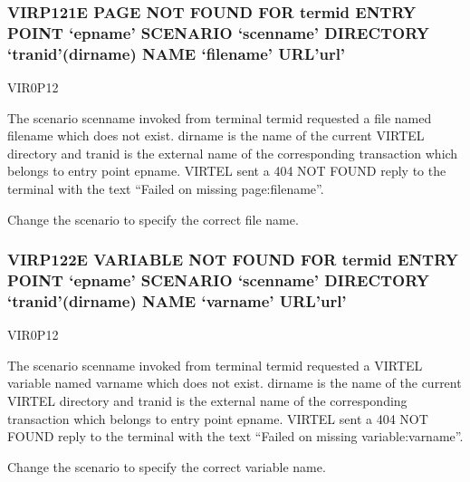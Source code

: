 \documentclass[letterpaper,10pt,english]{sphinxmanual}
\begin{document}
\subsubsection{VIRP121E PAGE NOT FOUND FOR termid ENTRY POINT ‘epname’ SCENARIO ‘scenname’ DIRECTORY ‘tranid’(dirname) NAME ‘filename’ URL’url’}
\label{\detokenize{messages:virp121e-page-not-found-for-termid-entry-point-epname-scenario-scenname-directory-tranid-dirname-name-filename-url-url}}\begin{description}
\sphinxAtStartPar
VIR0P12

\sphinxAtStartPar
The scenario scenname invoked from terminal termid requested a file named filename which does not exist. dirname is the name of the current VIRTEL directory and tranid is the external name of the corresponding transaction which belongs to entry point epname. VIRTEL sent a 404 NOT FOUND reply to the terminal with the text “Failed on missing page:filename”.

\sphinxAtStartPar
Change the scenario to specify the correct file name.

\end{description}


\subsubsection{VIRP122E VARIABLE NOT FOUND FOR termid ENTRY POINT ‘epname’ SCENARIO ‘scenname’ DIRECTORY ‘tranid’(dirname) NAME ‘varname’ URL’url’}
\label{\detokenize{messages:virp122e-variable-not-found-for-termid-entry-point-epname-scenario-scenname-directory-tranid-dirname-name-varname-url-url}}\begin{description}
\sphinxAtStartPar
VIR0P12

\sphinxAtStartPar
The scenario scenname invoked from terminal termid requested a VIRTEL variable named varname which does not exist. dirname is the name of the current VIRTEL directory and tranid is the external name of the corresponding transaction which belongs to entry point epname. VIRTEL sent a 404 NOT FOUND reply to the terminal with the text “Failed on missing variable:varname”.

\sphinxAtStartPar
Change the scenario to specify the correct variable name.

\end{description}
\end{document}
